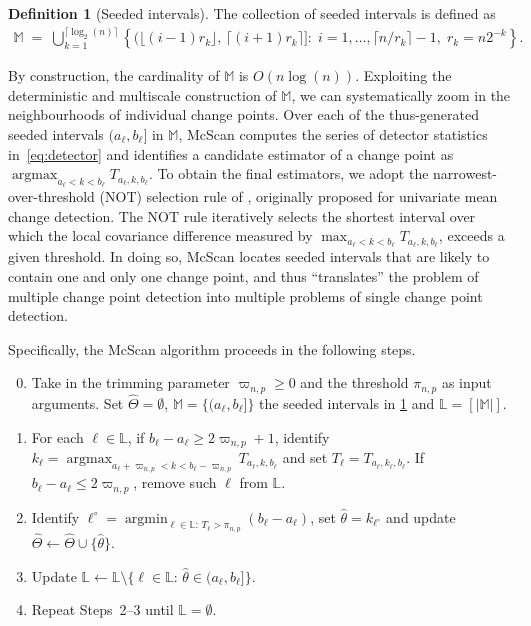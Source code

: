 \documentclass[11pt, a4paper]{article}
\renewcommand{\l}{\left}
\renewcommand{\r}{\right}
\def\wh{\widehat}
\newcommand{\cp}{\theta}
\newcommand{\Cp}{\Theta}
\theoremstyle{definition}
\theoremstyle{definition}
\theoremstyle{definition}
\theoremstyle{definition}
\theoremstyle{definition}
\theoremstyle{remark}
\theoremstyle{definition}
\newtheorem{defn}{Definition}
\theoremstyle{definition}
\theoremstyle{definition}
\begin{document}
\begin{defn}[Seeded intervals]
\label{def:seed}
	The collection of seeded intervals is defined as 
	\begin{align*}
	\mathbb{M} \;=\;\bigcup_{k = 1}^{\lceil\log_2(n)\rceil}\l\{\bigl(\lfloor(i-1)r_k\rfloor, \, \lceil({i+1})r_k\rceil\bigr]: \; i = 1, \ldots, \lceil n/r_k \rceil - 1,\; r_k = n2^{-k}\r\}.
	\end{align*}
\end{defn}
By construction, the cardinality of $\mathbb{M}$ is $O(n \log(n))$.
Exploiting the deterministic and multiscale construction of $\mathbb{M}$, we can systematically zoom in the neighbourhoods of individual change points. 
Over each of the thus-generated seeded intervals $(a_\ell, b_\ell]$ in $\mathbb{M}$, McScan computes the series of detector statistics in~\eqref{eq:detector} and identifies a candidate estimator of a change point as $\mathop{\arg\max}_{a_\ell < k < b_\ell} T_{a_\ell, k, b_\ell}$. To obtain the final estimators, we adopt the narrowest-over-threshold (NOT) selection rule of \cite{baranowski2019narrowest}, originally proposed for univariate mean change detection. The NOT rule iteratively selects the shortest interval over which the local covariance difference measured by $\mathop{\max}_{a_\ell < k < b_\ell} T_{a_\ell, k, b_\ell}$,
exceeds a given threshold.
In doing so, McScan locates seeded intervals that are likely to contain one and only one change point, and thus \enquote{translates} the problem of multiple change point detection into multiple problems of single change point detection.

Specifically, the McScan algorithm proceeds in the following steps.
\begin{enumerate}[wide, label = {\bf Step~\arabic*:}]
	\setcounter{enumi}{-1}
	\item Take in the trimming parameter $\varpi_{n, p} \ge 0$ and the threshold $\pi_{n, p}$ as input arguments. 
	Set $\wh{\Cp} = \emptyset$, $\mathbb{M} = \{(a_\ell, b_\ell]\}$ the seeded intervals in \cref{def:seed} and $\mathbb{L} = [ \vert \mathbb{M} \vert ]$.
	
	\item For each $\ell \in \mathbb{L}$, if $b_\ell - a_\ell \ge 2\varpi_{n, p} + 1$, identify $k_\ell = \mathop{\arg\max}_{a_\ell + \varpi_{n, p} < k < b_\ell - \varpi_{n, p}} T_{a_\ell, k, b_\ell}$ and set $T_\ell = T_{a_\ell, k_\ell, b_\ell}$.
	If $b_\ell - a_\ell \le 2\varpi_{n, p}$, remove such $\ell$ from $\mathbb{L}$.
	
	\item Identify $\ell^\circ = \mathop{\arg\min}_{\ell \in \mathbb{L}: \, T_\ell > \pi_{n, p} } (b_\ell - a_\ell)$, set $\wh\cp = k_{\ell^\circ}$ and update $\wh{\Cp} \leftarrow \wh{\Cp} \cup \{ \wh\cp \}$. 
	
	\item Update $\mathbb{L} \leftarrow \mathbb{L} \setminus \{ \ell \in \mathbb{L}: \, \wh\cp \in (a_\ell, b_\ell] \}$. 
    
        \item Repeat Steps~2--3 until $\mathbb{L} = \emptyset$.
\end{enumerate}
\end{document}
